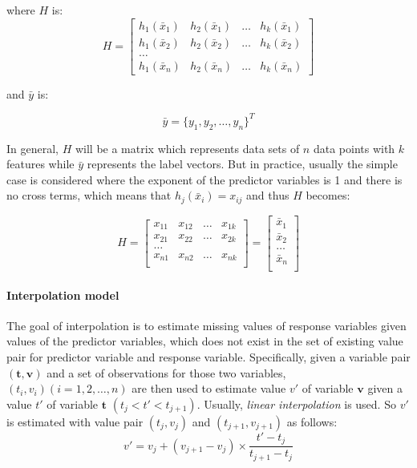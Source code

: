 where $H$ is:
\begin{equation}
    H=\begin{bmatrix}
h_1(\bar{x}_1) & h_2(\bar{x}_1) &\dots &h_k(\bar{x}_1)\\
h_1(\bar{x}_2) & h_2(\bar{x}_2) &\dots &h_k(\bar{x}_2)\\
\dots\\
h_1(\bar{x}_n) & h_2(\bar{x}_n) &\dots &h_k(\bar{x}_n)
\end{bmatrix}
\end{equation}

and $\bar{y}$ is:

\begin{equation}
    \bar{y} = \{y_1, y_2,\dots, y_n\}^T
\end{equation}

In general, $H$ will be a matrix which represents data sets of $n$ data points with $k$ features while $\bar{y}$ represents the label vectors. But in practice, usually the simple case is considered where the exponent of the predictor variables is 1 and there is no cross terms, which means that $h_j(\bar{x}_i) = x_{ij}$ and thus $H$ becomes:

\begin{equation}
    H=\begin{bmatrix}
x_{11} & x_{12} &\dots &x_{1k}\\
x_{21} & x_{22} &\dots &x_{2k}\\
\dots\\
x_{n1} & x_{n2} &\dots &x_{nk}\\
\end{bmatrix}
=\begin{bmatrix}
\bar{x}_1\\
\bar{x}_2\\
\dots\\
\bar{x}_n\\
\end{bmatrix}
\end{equation}


\paragraph{Interpolation model} 

The goal of interpolation is to estimate missing values of response variables given values of the predictor variables, which does not exist in the set of existing value pair for predictor variable and response variable. Specifically, given a variable pair $(\textbf{t},\textbf{v})$ and a set of observations for those two variables, $(t_i, v_i)(i=1,2,\dots,n)$ are then used to estimate value $v'$ of variable $\textbf{v}$ given a value $t'$ of variable $\textbf{t}$ $(t_j< t' < t_{j+1})$. Usually, {\em linear interpolation} is used. So $v'$ is estimated with value pair $(t_j, v_j)$ and $(t_{j+1}, v_{j+1})$ as follows:
\begin{equation}\label{eq: interpolation}
    v'= v_j + (v_{j+1}-v_j)\times\frac{t'-t_j}{t_{j+1}-t_j}
\end{equation}



